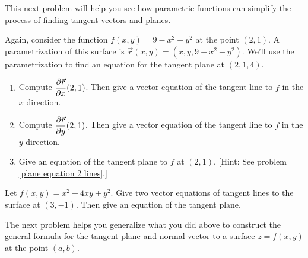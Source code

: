 This next problem will help you see how parametric functions can simplify the process of finding tangent vectors and planes.
\begin{problem}%
 Again, consider the function $f(x,y)=9-x^2-y^2$ at the point $(2,1)$. A parametrization of this surface is $\vec r(x,y) = (x,y,9-x^2-y^2)$. We'll use the parametrization to find an equation for the tangent plane at $(2,1,4)$.
\begin{enumerate}
 \item Compute $\displaystyle\frac{\partial \vec r}{\partial x}(2,1)$. Then give a vector equation of the tangent line to $f$ in the $x$ direction.
 \item Compute $\displaystyle\frac{\partial \vec r}{\partial y}(2,1)$. Then give a vector equation of the tangent line to $f$ in the $y$ direction.
 \item Give an equation of the tangent plane to $f$ at $(2,1)$. [Hint: See problem \ref{plane equation 2 lines}.]
\end{enumerate}
\end{problem}

\begin{problem}%
%
 Let $f(x,y)=x^2+4xy+y^2$.  Give two vector equations of tangent lines to the surface at $(3,-1)$. Then give an equation of the tangent plane.
\end{problem}

The next problem helps you generalize what you did above to construct the general formula for the tangent plane and normal vector to a surface $z=f(x,y)$ at the point $(a,b)$.

